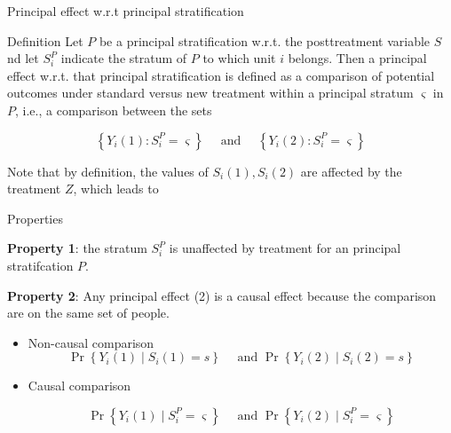 \documentclass[10pt]{beamer}
\begin{document}
\begin{frame}{Principal effect w.r.t principal stratification}
\begin{block}{Definition}
Let $P$ be a principal stratification w.r.t. the posttreatment variable $S$ nd let $S_i^P$ indicate the stratum of $P$ to which unit $i$ belongs. Then a principal effect w.r.t. that principal stratification is defined as a comparison of potential outcomes under standard versus new treatment within a principal stratum $\varsigma$ in $P$, i.e., a comparison between the sets

\begin{equation}
\left\{Y_i(1): S_i^P=\varsigma\right\} \quad \text { and } \quad\left\{Y_i(2): S_i^P=\varsigma\right\}    
\end{equation}
\end{block}

Note that by definition, the values of $S_i(1), S_i(2)$ are affected by the treatment $Z$, which leads to 
\end{frame}

\begin{frame}{Properties}

\textbf{Property 1}: the stratum $S_i^P$ is unaffected by treatment for an principal stratifcation $P$.

\textbf{Property 2}: Any principal effect (2) is a causal effect because the comparison are on the same set of people.


\begin{itemize}
    \item Non-causal comparison
$$
\Pr\left\{Y_i(1) \mid S_i(1)=s\right\} \quad \text { and } \Pr\left\{Y_i(2) \mid S_i(2)=s\right\}
$$

\item Causal comparison

$$
\Pr\left\{Y_i(1) \mid S_i^P=\varsigma \right\} \quad \text { and } \Pr\left\{Y_i(2) \mid S_i^P=\varsigma \right\}
$$
\end{itemize}
\end{frame}
\end{document}

